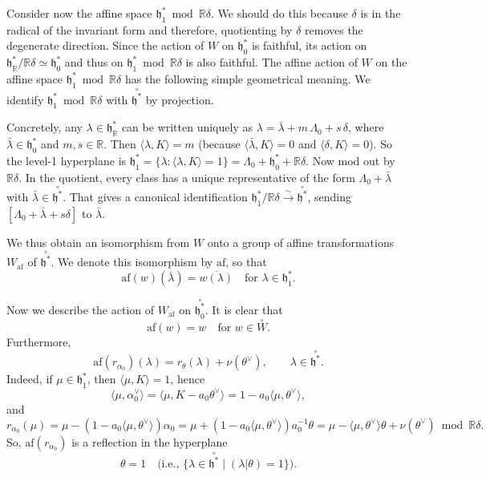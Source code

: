 \documentclass[12pt]{article}
\begin{document}
Consider now the affine space $\mathfrak{h}^*_1 \bmod \mathbb{R}\delta$. We should do this because $\delta$ is in the radical of the invariant form and therefore, quotienting by $\delta$ removes the degenerate direction. Since the action of $W$ on $\mathfrak{h}^*_0$ is faithful, its action on $\mathfrak{h}^*_\mathbb{R}/\mathbb{R}\delta \simeq \mathfrak{h}^*_0$ and thus on $\mathfrak{h}^*_1 \bmod \mathbb{R}\delta$ is also faithful. The affine action of $W$ on the affine space $\mathfrak{h}^*_1 \bmod \mathbb{R}\delta$ has the following simple geometrical meaning. We identify $\mathfrak{h}^*_1 \bmod \mathbb{R}\delta$ with $\overset{\circ}{\mathfrak{h}^*}$ by projection.

Concretely, any $\lambda\in\mathfrak{h}^*_\mathbb{R}$ can be written uniquely as $\lambda = \bar{\lambda} + m\,\Lambda_0 + s\,\delta$, where $\bar{\lambda}\in\mathfrak{h}^*_0$ and $m,s\in\mathbb{R}$. Then $\langle\lambda,K\rangle = m$ (because $\langle\bar\lambda,K\rangle=0$ and $\langle\delta,K\rangle=0$). So the level-1 hyperplane is $\mathfrak{h}^*_1=\{\lambda:\langle\lambda,K\rangle=1\} = \Lambda_0 + \mathfrak{h}^*_0 + \mathbb{R}\delta$.  Now mod out by $\mathbb{R}\delta$. In the quotient, every class has a unique representative of the form $\Lambda_0+\bar{\lambda}$ with $\bar{\lambda}\in\overset{\circ}{\mathfrak{h}^*}$. That gives a canonical identification
$\mathfrak{h}^*_1/\mathbb{R}\delta \xrightarrow{\sim} \overset{\circ}{\mathfrak{h}^*}$, sending $[\Lambda_0+\bar{\lambda}+s\delta]$ to $\bar{\lambda}$.


We thus obtain an isomorphism from $W$ onto a group of affine transformations $W_{\mathrm{af}}$ of $\overset{\circ}{\mathfrak{h}^*}$. We denote this isomorphism by $\mathrm{af}$, so that
\[
    \mathrm{af}(w)(\bar\lambda) = \overline{w(\lambda)} \quad \text{for } \lambda \in \mathfrak{h}^*_1.
\]

Now we describe the action of $W_{\mathrm{af}}$ on $\overset{\circ}{\mathfrak{h}^*_0}$. It is clear that
\begin{equation} \label{6.6.1}
    \mathrm{af}(w) = w \quad \text{for } w \in \overset{\circ}{W}.
\end{equation}
Furthermore,
\begin{equation} \label{6.6.2}
    \mathrm{af}(r_{\alpha_0})(\lambda) = r_\theta(\lambda) + \nu(\theta^\vee),
    \qquad \lambda \in \overset{\circ}{\mathfrak{h}^*}.
\end{equation}
Indeed, if $\mu \in \mathfrak{h}^*_1$, then $\langle \mu,K\rangle = 1$, hence
\[
    \langle \mu,\alpha_0^\vee\rangle = \langle \mu, K - a_0\theta^\vee\rangle
    = 1 - a_0\langle \mu,\theta^\vee\rangle,
\]
and
\[
    r_{\alpha_0}(\mu) = \mu - (1 - a_0\langle \mu,\theta^\vee\rangle)\alpha_0
    = \mu + (1 - a_0\langle \mu,\theta^\vee\rangle)a_0^{-1}\theta
    = \mu - \langle \mu,\theta^\vee\rangle\theta + \nu(\theta^\vee) \bmod \mathbb{R}\delta.
\]
So, $\mathrm{af}(r_{\alpha_0})$ is a reflection in the hyperplane
\[
    \theta = 1 \quad \text{(i.e., } \{\lambda \in \overset{\circ}{\mathfrak{h}^*} \mid (\lambda|\theta)=1\}).
\]
\end{document}
